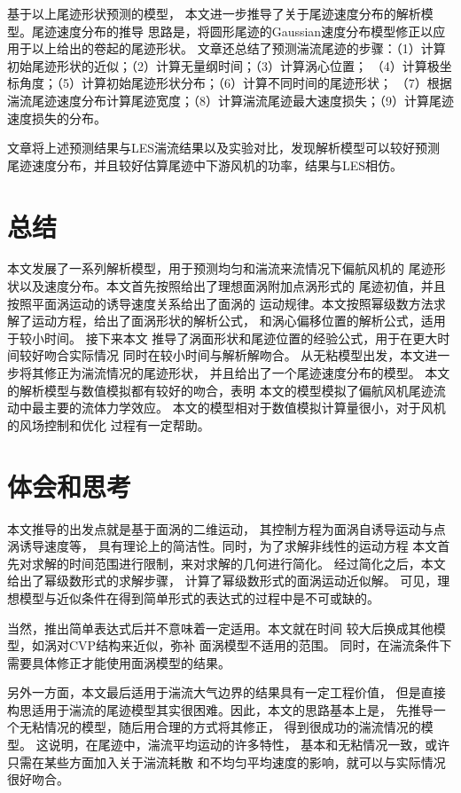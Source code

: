 \documentclass[UTF8,zihao=5]{ctexart} %
\begin{document}
基于以上尾迹形状预测的模型，
本文进一步推导了关于尾迹速度分布的解析模型。尾迹速度分布的推导
思路是，将圆形尾迹的Gaussian速度分布模型修正以应用于以上给出的卷起的尾迹形状。
文章还总结了预测湍流尾迹的步骤：（1）计算初始尾迹形状的近似；（2）计算无量纲时间；（3）计算涡心位置；
（4）计算极坐标角度；（5）计算初始尾迹形状分布；（6）计算不同时间的尾迹形状；
（7）根据湍流尾迹速度分布计算尾迹宽度；（8）计算湍流尾迹最大速度损失；（9）计算尾迹速度损失的分布。

文章将上述预测结果与LES湍流结果以及实验对比，发现解析模型可以较好预测
尾迹速度分布，并且较好估算尾迹中下游风机的功率，结果与LES相仿。

\section{总结}

本文发展了一系列解析模型，用于预测均匀和湍流来流情况下偏航风机的
尾迹形状以及速度分布。本文首先按照给出了理想面涡附加点涡形式的
尾迹初值，并且按照平面涡运动的诱导速度关系给出了面涡的
运动规律。本文按照幂级数方法求解了运动方程，给出了面涡形状的解析公式，
和涡心偏移位置的解析公式，适用于较小时间。
接下来本文
推导了涡面形状和尾迹位置的经验公式，用于在更大时间较好吻合实际情况
同时在较小时间与解析解吻合。
从无粘模型出发，本文进一步将其修正为湍流情况的尾迹形状，
并且给出了一个尾迹速度分布的模型。
本文的解析模型与数值模拟都有较好的吻合，表明
本文的模型模拟了偏航风机尾迹流动中最主要的流体力学效应。
本文的模型相对于数值模拟计算量很小，对于风机的风场控制和优化
过程有一定帮助。


\section{体会和思考}
本文推导的出发点就是基于面涡的二维运动，
其控制方程为面涡自诱导运动与点涡诱导速度等，
具有理论上的简洁性。同时，为了求解非线性的运动方程
本文首先对求解的时间范围进行限制，来对求解的几何进行简化。
经过简化之后，本文给出了幂级数形式的求解步骤，
计算了幂级数形式的面涡运动近似解。
可见，理想模型与近似条件在得到简单形式的表达式的过程中是不可或缺的。

当然，推出简单表达式后并不意味着一定适用。本文就在时间
较大后换成其他模型，如涡对CVP结构来近似，弥补
面涡模型不适用的范围。
同时，在湍流条件下需要具体修正才能使用面涡模型的结果。

另外一方面，本文最后适用于湍流大气边界的结果具有一定工程价值，
但是直接构思适用于湍流的尾迹模型其实很困难。因此，本文的思路基本上是，
先推导一个无粘情况的模型，随后用合理的方式将其修正，
得到很成功的湍流情况的模型。
这说明，在尾迹中，湍流平均运动的许多特性，
基本和无粘情况一致，或许只需在某些方面加入关于湍流耗散
和不均匀平均速度的影响，就可以与实际情况很好吻合。
\end{document}
